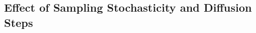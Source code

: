 \documentclass[times, review, 10pt]{elsarticle}
\begin{document}





\subsection{Effect of Sampling Stochasticity and Diffusion Steps}
\end{document}
